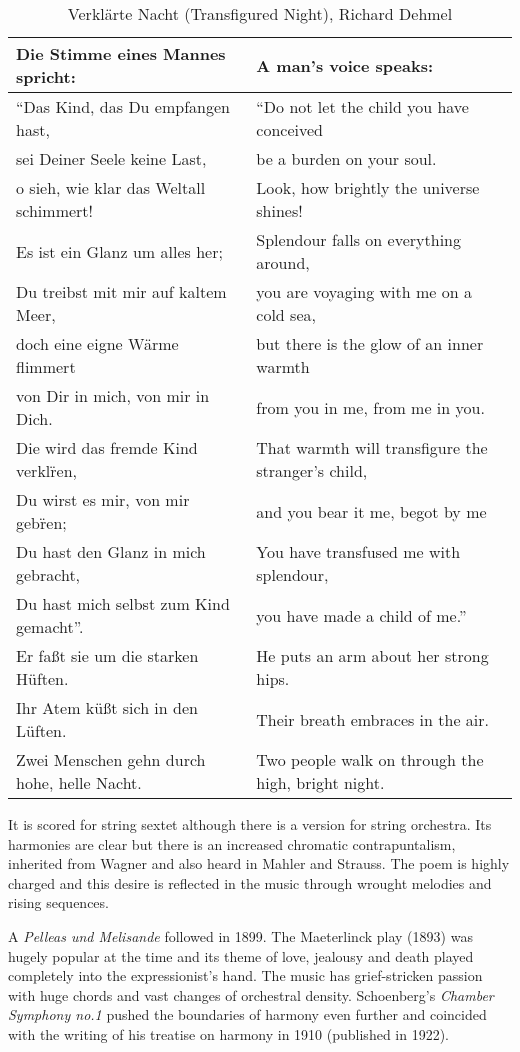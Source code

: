\begin{table}[h!]
\begin{tabular}{|l|l|}
Die Stimme eines Mannes spricht: & A man’s voice speaks:\\
\hline
``Das Kind, das Du empfangen hast, & ``Do not let the child you have conceived\\
sei Deiner Seele keine Last, & be a burden on your soul.\\
o sieh, wie klar das Weltall schimmert!  & Look, how brightly the universe shines!\\
Es ist ein Glanz um alles her; & Splendour falls on everything around,\\
Du treibst mit mir auf kaltem Meer, & you are voyaging with me on a cold sea,\\
doch eine eigne W\"arme flimmert & but there is the glow of an inner warmth\\
von Dir in mich, von mir in Dich. & from you in me, from me in you.\\
Die wird das fremde Kind verkl\"ren, & That warmth will transfigure the stranger’s child,\\
Du wirst es mir, von mir geb\"ren; & and you bear it me, begot by me\\
Du hast den Glanz in mich gebracht, & You have transfused me with splendour,\\
Du hast mich selbst zum Kind gemacht''. & you have made a child of me.''\\
\hline
Er fa{\ss}t sie um die starken H\"uften. & He puts an arm about her strong hips.\\
Ihr Atem k\"u{\ss}t sich in den L\"uften. & Their breath embraces in the air.\\
Zwei Menschen gehn durch hohe, helle Nacht. & Two people walk on through the high, bright night.\\
\hline
\end{tabular}
\caption{Verkl\"arte Nacht (Transfigured Night), Richard Dehmel}
\label{tab:faune}
\end{table}

It is scored for string sextet although there is a version for string orchestra. Its harmonies are clear but there is an increased chromatic contrapuntalism, inherited from Wagner and also heard in Mahler and Strauss. 
The poem is highly charged and this desire is reflected in the music through wrought melodies and rising sequences. 

A \textit{Pelleas und Melisande} followed in 1899. The Maeterlinck play (1893) was hugely popular at the time and its theme of love, jealousy and death played completely into the expressionist's hand. The music has grief-stricken passion with huge chords and vast changes of orchestral density. Schoenberg's \textit{Chamber Symphony no.1} pushed the boundaries of harmony even further and coincided with the writing of his treatise on harmony in 1910 (published in 1922). 

